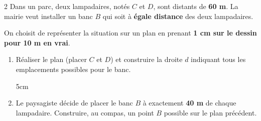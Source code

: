 \documentclass[a4paper]{book}
\begin{document}
{    \begin{exerciceNote}{2}
        Dans un parc, deux lampadaires, notés $C$ et $D$, sont distants de \textbf{60 m}. 
        La mairie veut installer un banc $B$ qui soit à \textbf{égale distance} des deux lampadaires.

        \medskip
        
        On choisit de représenter la situation sur un plan en prenant \textbf{1 cm sur le dessin pour 10 m en vrai}.

        \begin{enumerate}[leftmargin=*]
            \item Réaliser le plan (placer $C$ et $D$) et construire la droite $d$ indiquant tous les emplacements possibles pour le banc.
            \begin{ZoneReponse}{5cm}
            \end{ZoneReponse}

            \item Le paysagiste décide de placer le banc $B$ à exactement \textbf{40 m} de chaque lampadaire. Construire, au compas, un point $B$ possible sur le plan précédent.
        \end{enumerate}
    \end{exerciceNote}
    
    
}
\end{document}
